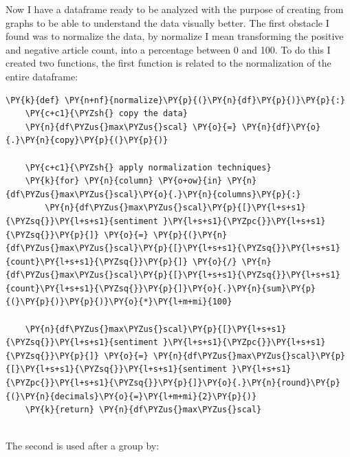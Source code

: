 Now I have a dataframe ready to be analyzed with the purpose of creating from graphs to be able to understand the data visually better.
The first obstacle I found was to normalize the data, by normalize I mean transforming the positive and negative article count, into a percentage between 0 and 100.
To do this I created two functions, the first function is related to the normalization of the entire dataframe:
\begin{tcolorbox}[breakable, size=fbox, boxrule=1pt, pad at break*=1mm,colback=cellbackground, colframe=cellborder]
\begin{Verbatim}[commandchars=\\\{\},fontsize=\footnotesize]
\PY{k}{def} \PY{n+nf}{normalize}\PY{p}{(}\PY{n}{df}\PY{p}{)}\PY{p}{:}
    \PY{c+c1}{\PYZsh{} copy the data}
    \PY{n}{df\PYZus{}max\PYZus{}scal} \PY{o}{=} \PY{n}{df}\PY{o}{.}\PY{n}{copy}\PY{p}{(}\PY{p}{)}

    \PY{c+c1}{\PYZsh{} apply normalization techniques}
    \PY{k}{for} \PY{n}{column} \PY{o+ow}{in} \PY{n}{df\PYZus{}max\PYZus{}scal}\PY{o}{.}\PY{n}{columns}\PY{p}{:}
        \PY{n}{df\PYZus{}max\PYZus{}scal}\PY{p}{[}\PY{l+s+s1}{\PYZsq{}}\PY{l+s+s1}{sentiment }\PY{l+s+s1}{\PYZpc{}}\PY{l+s+s1}{\PYZsq{}}\PY{p}{]} \PY{o}{=} \PY{p}{(}\PY{n}{df\PYZus{}max\PYZus{}scal}\PY{p}{[}\PY{l+s+s1}{\PYZsq{}}\PY{l+s+s1}{count}\PY{l+s+s1}{\PYZsq{}}\PY{p}{]} \PY{o}{/} \PY{n}{df\PYZus{}max\PYZus{}scal}\PY{p}{[}\PY{l+s+s1}{\PYZsq{}}\PY{l+s+s1}{count}\PY{l+s+s1}{\PYZsq{}}\PY{p}{]}\PY{o}{.}\PY{n}{sum}\PY{p}{(}\PY{p}{)}\PY{p}{)}\PY{o}{*}\PY{l+m+mi}{100}
        
    \PY{n}{df\PYZus{}max\PYZus{}scal}\PY{p}{[}\PY{l+s+s1}{\PYZsq{}}\PY{l+s+s1}{sentiment }\PY{l+s+s1}{\PYZpc{}}\PY{l+s+s1}{\PYZsq{}}\PY{p}{]} \PY{o}{=} \PY{n}{df\PYZus{}max\PYZus{}scal}\PY{p}{[}\PY{l+s+s1}{\PYZsq{}}\PY{l+s+s1}{sentiment }\PY{l+s+s1}{\PYZpc{}}\PY{l+s+s1}{\PYZsq{}}\PY{p}{]}\PY{o}{.}\PY{n}{round}\PY{p}{(}\PY{n}{decimals}\PY{o}{=}\PY{l+m+mi}{2}\PY{p}{)}
    \PY{k}{return} \PY{n}{df\PYZus{}max\PYZus{}scal}
    
\end{Verbatim}
\end{tcolorbox}
The second is used after a group by:


